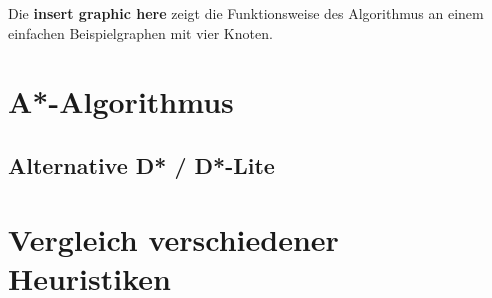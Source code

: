 	Die \textbf{insert graphic here} zeigt die Funktionsweise des Algorithmus an einem einfachen Beispielgraphen mit vier Knoten.
	
	
\section{A*-Algorithmus}
\cite{Hart1968}
\subsection{Alternative D* / D*-Lite}
\cite{DStarAlg}
\cite{Koenig2005}

\section{Vergleich verschiedener Heuristiken}

\cite{Patel2016}